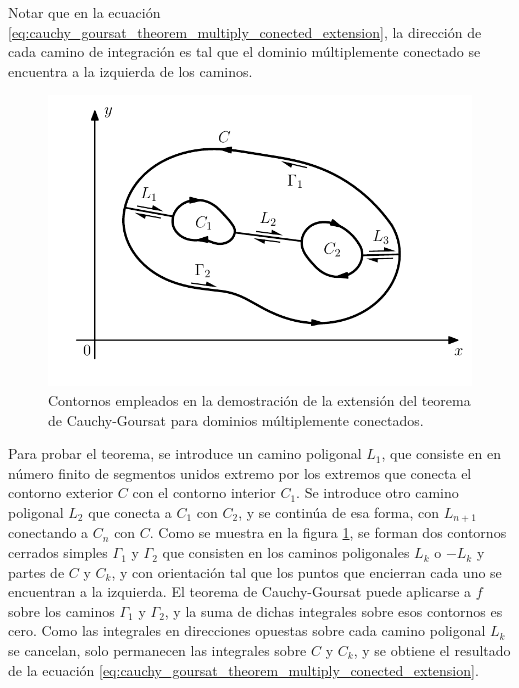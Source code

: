 \documentclass[a4paper]{report}
\begin{document}
Notar que en la ecuación \ref{eq:cauchy_goursat_theorem_multiply_conected_extension}, la dirección de cada camino de integración es tal que el dominio múltiplemente conectado se encuentra a la izquierda de los caminos.

\begin{figure}[!htb]
  \begin{minipage}[c]{0.6\textwidth}
    \includegraphics[width=\textwidth]{figuras/cauchy_goursat_theorem_multiply_connected.pdf}
  \end{minipage}\hfill
  \begin{minipage}[c]{0.3\textwidth}
    \caption{
       Contornos empleados en la demostración de la extensión del teorema de Cauchy-Goursat para dominios múltiplemente conectados. 
    }\label{fig:cauchy_goursat_theorem_multiply_connected}
  \end{minipage}
\end{figure}
Para probar el teorema, se introduce un camino poligonal \(L_1\), que consiste en en número finito de segmentos unidos extremo por los extremos que conecta el contorno exterior \(C\) con el contorno interior \(C_1\). Se introduce otro camino poligonal \(L_2\) que conecta a \(C_1\) con \(C_2\), y se continúa de esa forma, con \(L_{n+1}\) conectando a \(C_n\) con \(C\). Como se muestra en la figura \ref{fig:cauchy_goursat_theorem_multiply_connected}, se forman dos contornos cerrados simples \(\Gamma_1\) y \(\Gamma_2\) que consisten en los caminos poligonales \(L_k\) o \(-L_k\) y partes de \(C\) y \(C_k\), y con orientación tal que los puntos que encierran cada uno se encuentran a la izquierda. El teorema de Cauchy-Goursat puede aplicarse a \(f\) sobre los caminos \(\Gamma_1\) y \(\Gamma_2\), y la suma de dichas integrales sobre esos contornos es cero. Como las integrales en direcciones opuestas sobre cada camino poligonal \(L_k\) se cancelan, solo permanecen las integrales sobre \(C\) y \(C_k\), y se obtiene el resultado de la ecuación \ref{eq:cauchy_goursat_theorem_multiply_conected_extension}.
\end{document}
